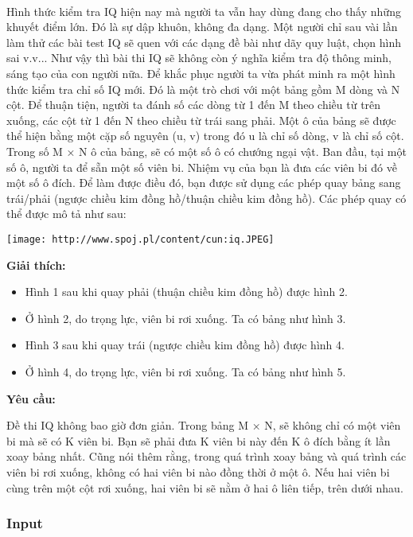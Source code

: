 

 

Hình thức kiểm tra IQ hiện nay mà người ta vẫn hay dùng đang cho thấy những khuyết điểm lớn. Đó là sự dập khuôn, không đa dạng. Một người chỉ sau vài lần làm thử các bài test IQ sẽ quen với các dạng đề bài như dãy quy luật, chọn hình sai v.v... Như vậy thì bài thi IQ sẽ không còn ý nghĩa kiểm tra độ thông minh, sáng tạo của con người nữa. Để khắc phục người ta vừa phát minh ra một hình thức kiểm tra chỉ số IQ mới. Đó là một trò chơi với một bảng gồm M dòng và N cột. Để thuận tiện, người ta đánh số các dòng từ 1 đến M theo chiều từ trên xuống, các cột từ 1 đến N theo chiều từ trái sang phải. Một ô của bảng sẽ được thể hiện bằng một cặp số nguyên (u, v) trong đó u là chỉ số dòng, v là chỉ số cột. Trong số M × N ô của bảng, sẽ có một số ô có chướng ngại vật. Ban đầu, tại một số ô, người ta để sẵn một số viên bi. Nhiệm vụ của bạn là đưa các viên bi đó về một số ô đích. Để làm được điều đó, bạn được sử dụng các phép quay bảng sang trái/phải (ngược chiều kim đồng hồ/thuận chiều kim đồng hồ). Các phép quay có thể được mô tả như sau:


\texttt{[image: http://www.spoj.pl/content/cun:iq.JPEG]}

\textbf{Giải thích:}
\begin{itemize}
	\item Hình 1 sau khi quay phải (thuận chiều kim đồng hồ) được hình 2.
	\item Ở hình 2, do trọng lực, viên bi rơi xuống. Ta có bảng như hình 3.
	\item Hình 3 sau khi quay trái (ngược chiều kim đồng hồ) được hình 4.
	\item Ở hình 4, do trọng lực, viên bi rơi xuống. Ta có bảng như hình 5.
\end{itemize}

\textbf{Yêu cầu:}

Đề thi IQ không bao giờ đơn giản. Trong bảng M × N, sẽ không chỉ có một viên bi mà sẽ có K viên bi. Bạn sẽ phải đưa K viên bi này đến K ô đích bằng ít lần xoay bảng nhất. Cũng nói thêm rằng, trong quá trình xoay bảng và quá trình các viên bi rơi xuống, không có hai viên bi nào đồng thời ở một ô. Nếu hai viên bi cùng trên một cột rơi xuống, hai viên bi sẽ nằm ở hai ô liên tiếp, trên dưới nhau.

\subsubsection{Input}

